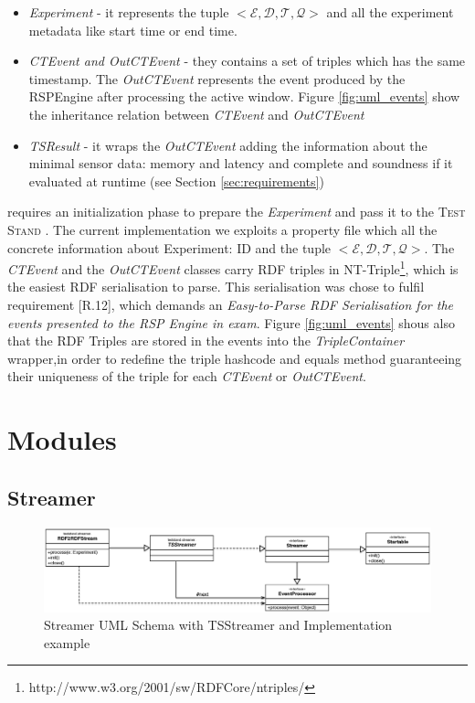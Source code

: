 \begin{itemize}
\item \textit{Experiment} - it represents the tuple $<\mathcal{E}, \mathcal{D},\mathcal{T},\mathcal{Q}>$ and all the experiment metadata like start time or end time.
\item \textit{CTEvent and OutCTEvent} - they contains a set of triples which has the same timestamp. The \textit{OutCTEvent} represents the event produced by the RSPEngine after processing the active window. Figure \ref{fig:uml_events} show the inheritance relation between \textit{CTEvent} and \textit{OutCTEvent}
\item \textit{TSResult} - it wraps the \textit{OutCTEvent} adding the information about the minimal sensor data: memory and latency and complete and soundness if it evaluated at runtime (see Section \ref{sec:requirements})
\end{itemize}

\name requires an initialization phase to prepare the \textit{Experiment} and pass it to the \textsc{Test Stand} . The current implementation we exploits a property file which all the concrete information about Experiment: ID and the tuple $<\mathcal{E}, \mathcal{D},\mathcal{T},\mathcal{Q}>$. 
The \textit{CTEvent} and the \textit{OutCTEvent} classes carry RDF triples in NT-Triple\footnote{http://www.w3.org/2001/sw/RDFCore/ntriples/}, which is the easiest RDF serialisation to parse. This serialisation was chose to fulfil requirement [R.12], which demands an \textit{Easy-to-Parse RDF Serialisation for the events presented to the RSP Engine in exam}. Figure \ref{fig:uml_events} shous also that the RDF Triples are stored in the events into the \textit{TripleContainer} wrapper,in order to redefine the triple hashcode and equals method guaranteeing their uniqueness of the triple for each \textit{CTEvent} or \textit{OutCTEvent}.

\section{Modules}

\subsection{Streamer}	\label{sec:streamer-impl}
\begin{figure}[tbh]
  \centering
	\includegraphics[width=\linewidth]{images/uml_tstreamer}
	\caption{Streamer UML Schema with TSStreamer and Implementation example} 
  	\label{fig:uml_tstreamer}
\end{figure}

